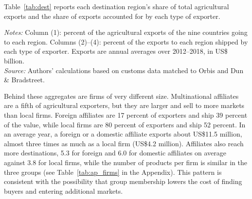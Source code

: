 \documentclass[11pt,a4paper]{article}
\newcommand{\srcnote}{\textit{Source:} Authors' calculations based on customs data matched to Orbis and Dun \& Bradstreet.}
\begin{document}
Table~\ref{tab:dest} reports each destination region's share of total agricultural exports and
the share of exports accounted for by each type of exporter.
\begin{table}[H]\centering\small%
  \caption{Agricultural Exports and Ownership, by Destination Region}%
  \label{tab:dest}%
  \par\vspace{3pt}%
  \begin{minipage}{0.95\textwidth}\footnotesize %
  \textit{Notes:} Column (1): percent of the agricultural exports of the nine countries going to each region. Columns (2)--(4): percent of the exports to each region shipped by each type of exporter. Exports are annual averages over 2012--2018, in US\$ billion.\\[3pt]%
  \srcnote%
  \end{minipage}%
  \end{table}

Behind these aggregates are firms of very different size. Multinational affiliates are a fifth of
agricultural exporters, but they are larger and sell to more markets than local firms. Foreign
affiliates are 17 percent of exporters and ship 39 percent of the value, while local firms are 80
percent of exporters and ship 52 percent. In an average year, a foreign or a domestic affiliate
exports about US\$11.5 million, almost three times as much as a local firm (US\$4.2 million).
Affiliates also reach more destinations, 5.3 for foreign and 6.0 for domestic affiliates on
average against 3.8 for local firms, while the number of products per firm is similar in the
three groups (see Table~\ref{tab:ap_firms} in the Appendix). This pattern is consistent with the possibility that group membership lowers the cost of finding
buyers and entering additional markets.
\end{document}
